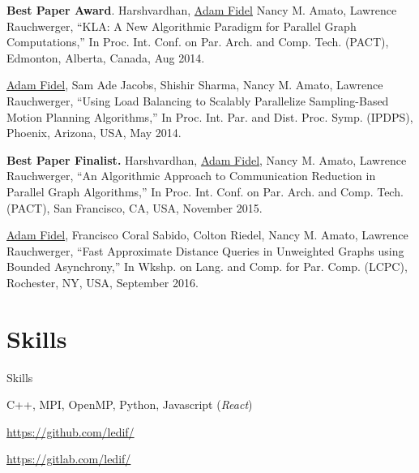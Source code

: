 \documentclass[a4paper,10pt,oneside]{article}
\begin{document}
\begin{body}
\begin{detail}
{{\bf Best Paper Award}. Harshvardhan, \underline{Adam Fidel} Nancy M. Amato, Lawrence Rauchwerger, ``KLA: A New Algorithmic Paradigm for Parallel Graph Computations,'' In Proc. Int. Conf. on Par. Arch. and Comp. Tech. (PACT), Edmonton, Alberta, Canada, Aug 2014.}
\end{detail}

\EntryGap

\begin{detail}
{\underline{Adam Fidel}, Sam Ade Jacobs, Shishir Sharma, Nancy M. Amato, Lawrence Rauchwerger, ``Using Load Balancing to Scalably Parallelize Sampling-Based Motion Planning Algorithms,'' In Proc. Int. Par. and Dist. Proc. Symp. (IPDPS), Phoenix, Arizona, USA, May 2014.}
\end{detail}

\EntryGap

\begin{detail}
{{\bf Best Paper Finalist.} Harshvardhan, \underline{Adam Fidel}, Nancy M. Amato, Lawrence Rauchwerger, ``An Algorithmic Approach to Communication Reduction in Parallel Graph Algorithms,'' In Proc. Int. Conf. on Par. Arch. and Comp. Tech. (PACT), San Francisco, CA, USA, November 2015.}
\end{detail}

\EntryGap

\begin{detail}
{\underline{Adam Fidel}, Francisco Coral Sabido, Colton Riedel, Nancy M. Amato, Lawrence Rauchwerger, ``Fast Approximate Distance Queries in Unweighted Graphs using Bounded Asynchrony,'' In Wkshp. on Lang. and Comp. for Par. Comp. (LCPC), Rochester, NY, USA, September 2016.}
\end{detail}

\section{Skills}
{Skills}

C++, MPI, OpenMP, Python, Javascript (\emph{React})

\par
\EntryGap
\href{https://github.com/ledif/}{https://github.com/ledif/}
\par
\EntryGap
\href{https://gitlab.com/ledif/}{https://gitlab.com/ledif/}

\end{body}
\end{document}
